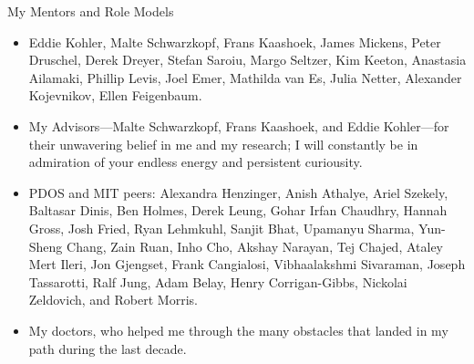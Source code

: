 \begin{center}{My Mentors and Role Models}\end{center} 
    \begin{itemize}
        \item Eddie Kohler, Malte Schwarzkopf, Frans
            Kaashoek, James Mickens, Peter Druschel, Derek Dreyer, Stefan
            Saroiu, Margo Seltzer, Kim Keeton, Anastasia Ailamaki, Phillip
            Levis, Joel Emer, Mathilda van Es, Julia Netter, Alexander Kojevnikov, Ellen
            Feigenbaum.

        \item My Advisors---Malte Schwarzkopf, Frans Kaashoek, and Eddie
            Kohler---for their unwavering belief in me and my research; I will
            constantly be in admiration of your endless energy and persistent
            curiousity.

        \item PDOS and MIT peers: 
            Alexandra Henzinger, Anish Athalye, Ariel Szekely, Baltasar Dinis, Ben Holmes,
            Derek Leung, Gohar Irfan Chaudhry, Hannah Gross, Josh Fried, Ryan
            Lehmkuhl, Sanjit Bhat, Upamanyu Sharma, Yun-Sheng Chang, Zain
            Ruan, Inho Cho,
            Akshay Narayan, Tej Chajed, Ataley Mert Ileri, Jon Gjengset, Frank Cangialosi,
            Vibhaalakshmi Sivaraman, Joseph Tassarotti, Ralf Jung, Adam Belay,
            Henry Corrigan-Gibbs, Nickolai Zeldovich, and Robert Morris.

        \item My doctors, who helped me through the many obstacles that landed in
            my path during the last decade.  
    \end{itemize}
    
